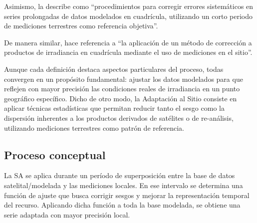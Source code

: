 \documentclass[letterpaper,12pt, twoside]{report}
\providecommand{\DIFdeltex}[1]{{\protect\color{red} \scriptsize #1}} %
\providecommand{\DIFdel}[1]{\texorpdfstring{\DIFdeltex{#1}}{}} %
\begin{document}
\DIFdel{Asimismo, \citet{YANG2021427} la describe como “procedimientos para corregir errores sistemáticos en series prolongadas de datos modelados en cuadrícula, utilizando un corto periodo de mediciones terrestres como referencia objetiva”.
}%

\DIFdel{De manera similar, \citet{rs17101720} hace referencia a “la aplicación de un método de corrección a productos de irradiancia en cuadrícula mediante el uso de mediciones en el sitio”.
}%

\DIFdel{Aunque cada definición destaca aspectos particulares del proceso, todas convergen en un propósito fundamental: ajustar los datos modelados para que reflejen con mayor precisión las condiciones reales de irradiancia en un punto geográfico específico. Dicho de otro modo, la Adaptación al Sitio consiste en aplicar técnicas estadísticas que permitan reducir tanto el sesgo como la dispersión inherentes a los productos derivados de satélites o de re-análisis, utilizando mediciones terrestres como patrón de referencia.
}%

\subsection{\DIFdel{Proceso conceptual}}
\addtocounter{subsection}{-1}%


\DIFdel{La SA se aplica durante un período de superposición entre la base de datos satelital/modelada y las mediciones locales. En ese intervalo se determina una función de ajuste que busca corrigir sesgos y mejorar la representación temporal del recurso. Aplicando dicha función a toda la base modelada, se obtiene una serie adaptada con mayor precisión local.
}%
\end{document}
